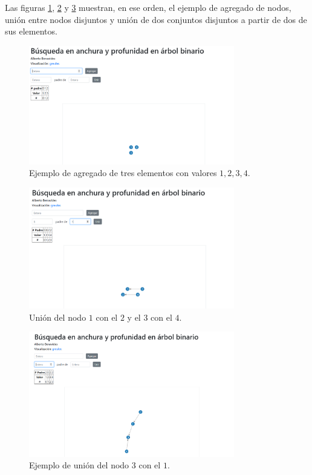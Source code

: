 \documentclass[paper=leter, fontsize=11pt]{scrartcl}
\numberwithin{equation}{section}		%
\numberwithin{figure}{section}			%
\numberwithin{table}{section}				%
\begin{document}
Las figuras \ref{agregado_nodos}, \ref{union_uno} y \ref{union_dos} muestran, en ese orden, el ejemplo de agregado de nodos, unión entre nodos disjuntos y unión de dos conjuntos disjuntos a partir de dos de sus elementos.

\begin{figure}
    \centering
    \includegraphics[width=0.8\textwidth]{2.png}
    \caption{Ejemplo de agregado de tres elementos con valores $1, 2, 3, 4$.}
    \label{agregado_nodos}
\end{figure}

\begin{figure}
    \centering
    \includegraphics[width=0.8\textwidth]{5.png}
    \caption{Unión del nodo $1$ con el $2$ y el $3$ con el $4$.}
    \label{union_uno}
\end{figure}

\begin{figure}
    \centering
    \includegraphics[width=0.8\textwidth]{6.png}
    \caption{Ejemplo de unión del nodo $3$ con el $1$.}
    \label{union_dos}
\end{figure}



\end{document}
